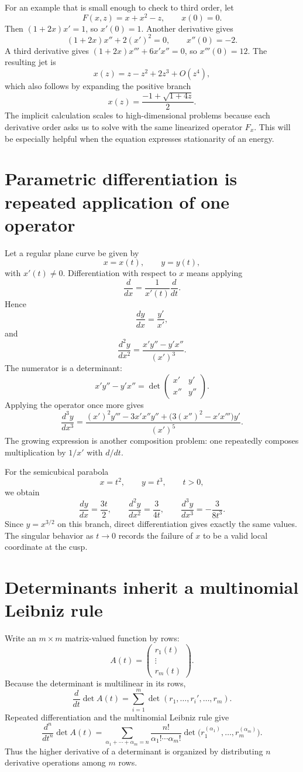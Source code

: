For an example that is small enough to check to third order, let
\[
 F(x,z)=x+x^2-z,\qquad x(0)=0.
\]
Then $(1+2x)x'=1$, so $x'(0)=1$. Another derivative gives
\[
 (1+2x)x''+2(x')^2=0,
 \qquad x''(0)=-2.
\]
A third derivative gives $(1+2x)x'''+6x'x''=0$, so $x'''(0)=12$. The resulting jet is
\[
 \boxed{x(z)=z-z^2+2z^3+O(z^4),}
\]
which also follows by expanding the positive branch
\[
 x(z)=\frac{-1+\sqrt{1+4z}}2.
\]
The implicit calculation scales to high-dimensional problems because each derivative order asks us to solve with the same linearized operator $F_x$. This will be especially helpful when the equation expresses stationarity of an energy.

\section{Parametric differentiation is repeated application of one operator}

Let a regular plane curve be given by
\[
  x=x(t),\qquad y=y(t),
\]
with \(x'(t)\neq0\).  Differentiation with respect to \(x\) means applying
\[
  \frac{d}{dx}=\frac1{x'(t)}\frac{d}{dt}.
\]
Hence
\[
  \frac{dy}{dx}=\frac{y'}{x'},
\]
and
\[
  \frac{d^2y}{dx^2}
  =\frac{x'y''-y'x''}{(x')^3}.
\]
The numerator is a determinant:
\[
  x'y''-y'x''
  =\det\begin{pmatrix}x'&y'\\x''&y''\end{pmatrix}.
\]
Applying the operator once more gives
\[
  \frac{d^3y}{dx^3}
  =\frac{(x')^2y'''-3x'x''y''+\bigl(3(x'')^2-x'x'''\bigr)y'}{(x')^5}.
\]
The growing expression is another composition problem: one repeatedly composes multiplication by \(1/x'\) with \(d/dt\).

For the semicubical parabola
\[
  x=t^2,\qquad y=t^3,
  \qquad t>0,
\]
we obtain
\[
  \frac{dy}{dx}=\frac{3t}{2},
  \qquad
  \frac{d^2y}{dx^2}=\frac{3}{4t},
  \qquad
  \frac{d^3y}{dx^3}=-\frac{3}{8t^3}.
\]
Since \(y=x^{3/2}\) on this branch, direct differentiation gives exactly the same values.  The singular behavior as \(t\to0\) records the failure of \(x\) to be a valid local coordinate at the cusp.

\section{Determinants inherit a multinomial Leibniz rule}

Write an \(m\times m\) matrix-valued function by rows:
\[
  A(t)=
  \begin{pmatrix}
    r_1(t)\\ \vdots\\ r_m(t)
  \end{pmatrix}.
\]
Because the determinant is multilinear in its rows,
\[
  \frac{d}{dt}\det A(t)
  =\sum_{i=1}^{m}
   \det(r_1,\ldots,r_i',\ldots,r_m).
\]
Repeated differentiation and the multinomial Leibniz rule give
\[
  \frac{d^n}{dt^n}\det A(t)
  =\sum_{\alpha_1+\cdots+\alpha_m=n}
   \frac{n!}{\alpha_1!\cdots\alpha_m!}
   \det\bigl(r_1^{(\alpha_1)},\ldots,r_m^{(\alpha_m)}\bigr).
\]
Thus the higher derivative of a determinant is organized by distributing \(n\) derivative operations among \(m\) rows.


